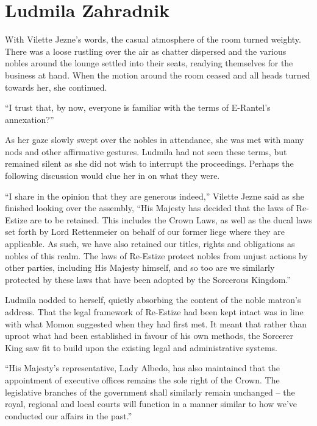 \chapter{Ludmila Zahradnik}

With Vilette Jezne’s words, the casual atmosphere of the room turned weighty. There was a loose rustling over the air as chatter dispersed and the various nobles around the lounge settled into their seats, readying themselves for the business at hand. When the motion around the room ceased and all heads turned towards her, she continued.

 

“I trust that, by now, everyone is familiar with the terms of E-Rantel’s annexation?”

 

As her gaze slowly swept over the nobles in attendance, she was met with many nods and other affirmative gestures. Ludmila had not seen these terms, but remained silent as she did not wish to interrupt the proceedings. Perhaps the following discussion would clue her in on what they were.

 

“I share in the opinion that they are generous indeed,” Vilette Jezne said as she finished looking over the assembly, “His Majesty has decided that the laws of Re-Estize are to be retained. This includes the Crown Laws, as well as the ducal laws set forth by Lord Rettenmeier on behalf of our former liege where they are applicable. As such, we have also retained our titles, rights and obligations as nobles of this realm. The laws of Re-Estize protect nobles from unjust actions by other parties, including His Majesty himself, and so too are we similarly protected by these laws that have been adopted by the Sorcerous Kingdom.”

 

Ludmila nodded to herself, quietly absorbing the content of the noble matron’s address. That the legal framework of Re-Estize had been kept intact was in line with what Momon suggested when they had first met. It meant that rather than uproot what had been established in favour of his own methods, the Sorcerer King saw fit to build upon the existing legal and administrative systems.

 

“His Majesty’s representative, Lady Albedo, has also maintained that the appointment of executive offices remains the sole right of the Crown. The legislative branches of the government shall similarly remain unchanged – the royal, regional and local courts will function in a manner similar to how we’ve conducted our affairs in the past.”

